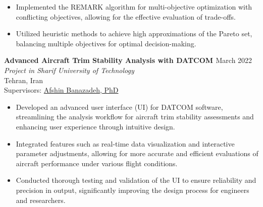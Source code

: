 \documentclass[12pt]{article}
\begin{document}
\begin{itemize} \itemsep -1pt %
    \item Implemented the REMARK algorithm for multi-objective optimization with conflicting objectives, allowing for the effective evaluation of trade-offs.
    \item Utilized heuristic methods to achieve high approximations of the Pareto set, balancing multiple objectives for optimal decision-making.
\end{itemize}


\noindent
{\bfseries Advanced Aircraft Trim Stability Analysis with DATCOM
\href{https://github.com/alibaniasad1999/DATCOM-Trim-Diagram-GUI}{\faGithub}
}
\hfill March 2022 \\ 
\noindent \textit{Project in Sharif University of Technology} \\ \hfill Tehran, Iran \\ 
\noindent Supervisors: 
\href{http://ae.sharif.edu/~portal/faculty/1014037799}{Afshin Banazadeh, PhD} 
\begin{itemize} \itemsep -1pt %
    \item Developed an advanced user interface (UI) for DATCOM software, streamlining the analysis workflow for aircraft trim stability assessments and enhancing user experience through intuitive design.
    \item Integrated features such as real-time data visualization and interactive parameter adjustments, allowing for more accurate and efficient evaluations of aircraft performance under various flight conditions.
    \item Conducted thorough testing and validation of the UI to ensure reliability and precision in output, significantly improving the design process for engineers and researchers.
\end{itemize}
\end{document}
